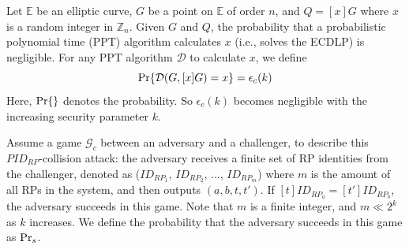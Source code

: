 Let $\mathbb{E}$ be an elliptic curve, %
    $G$ be a point on $\mathbb{E}$ of order $n$,
        and $Q = [x]G$ where $x$ is a random integer in $\mathbb{Z}_n$.
Given $G$ and $Q$,
    the probability that a probabilistic polynomial time (PPT) algorithm calculates $x$ (i.e., solves the ECDLP) is negligible.
For any PPT algorithm $\mathcal{D}$ to calculate $x$, we define
\begin{equation*}
{\rm Pr}\{\mathcal{D}(G, [x]G)=x\} = \epsilon_{c}(k)
\end{equation*}
Here, ${\rm Pr}\{\}$ denotes the probability.
So $\epsilon_{c}(k)$ becomes negligible with the increasing security parameter $k$.

Assume a game $\mathcal{G}_c$ between an adversary and a challenger,
    to describe this $PID_{RP}$-collision attack:
the adversary receives a finite set of RP identities from the challenger,
 denoted as ($ID_{RP_1}$, $ID_{RP_2}$, ..., $ID_{RP_m}$)
 where $m$ is the amount of all RPs in the system,
  and then outputs $(a, b, t, t')$.
If $[t]ID_{RP_a}=[t']ID_{RP_b}$, the adversary succeeds in this game.
Note that $m$ is a finite integer, and $m \ll 2^k$ as $k$ increases.
We define the probability that the adversary succeeds in this game as ${\rm Pr}_s$.


